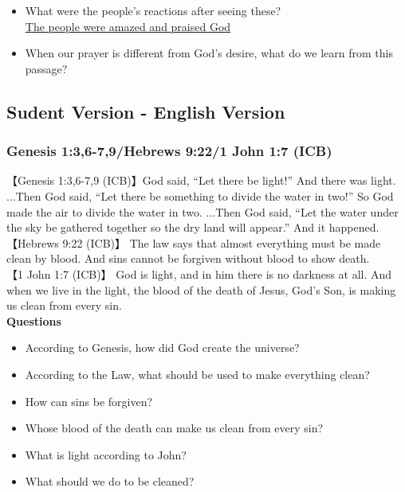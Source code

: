 \begin{itemize}[noitemsep]
\item What were the people's reactions after seeing these?\\
\underline{The people were amazed and praised God}

\item When our prayer is different from God's desire, what do we learn from this passage?
\end{itemize}












\newpage
\Large
\subsection{\LARGE{Sudent Version - English Version}}
\large
\vspace{.25cm}
\subsubsection{\large{Genesis 1:3,6-7,9/Hebrews 9:22/1 John 1:7 (ICB)}}
【Genesis 1:3,6-7,9 (ICB)】God said, “Let there be light!” And there was light. ...Then God said, “Let there be something to divide the water in two!” So God made the air to divide the water in two. ...Then God said, “Let the water under the sky be gathered together so the dry land will appear.” And it happened.\\
【Hebrews 9:22 (ICB)】 The law says that almost everything must be made clean by blood. And sins cannot be forgiven without blood to show death.\\
【1 John 1:7 (ICB)】 God is light, and in him there is no darkness at all. And when we live in the light, the blood of the death of Jesus, God’s Son, is making us clean from every sin.\\
\vspace{.25cm}
\textbf{Questions}\vspace{-.5cm}
\begin{itemize}[noitemsep]
\item According to Genesis, how did God create the universe?
\item According to the Law, what should be used to make everything clean?
\item How can sins be forgiven?
\item Whose blood of the death can make us clean from every sin?
\item What is light according to John?
\item What should we do to be cleaned?
\end{itemize}


